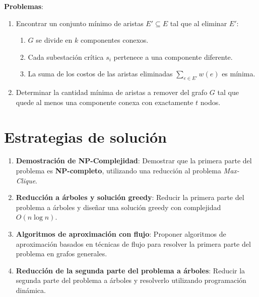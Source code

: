 \documentclass[a4paper, 12pt]{article}
\begin{document}
\noindent \textbf{Problemas}:
\begin{enumerate}
    \item Encontrar un conjunto mínimo de aristas \( E' \subseteq E \) tal que al eliminar \( E' \):
    \begin{enumerate}
        \item \( G \) se divide en \( k \) componentes conexos.
        \item Cada subestación crítica \( s_i \) pertenece a una componente diferente.
        \item La suma de los costos de las aristas eliminadas \( \sum_{e \in E'} w(e) \) es mínima.
    \end{enumerate}
    \item Determinar la cantidad mínima de aristas a remover del grafo \( G \) tal que quede al menos una componente conexa con exactamente \( t \) nodos.
\end{enumerate}

\section*{Estrategias de solución}
\begin{enumerate}
    \item \textbf{Demostración de NP-Complejidad}: 
    Demostrar que la primera parte del problema es \textbf{NP-completo}, utilizando una reducción al problema \textit{Max-Clique}.
    \item \textbf{Reducción a árboles y solución greedy}: 
    Reducir la primera parte del problema a árboles y diseñar una solución greedy con complejidad \( O(n \log n) \).
    \item \textbf{Algoritmos de aproximación con flujo}: 
    Proponer algoritmos de aproximación basados en técnicas de flujo para resolver la primera parte del problema en grafos generales.
    \item \textbf{Reducción de la segunda parte del problema a árboles}: 
    Reducir la segunda parte del problema a árboles y resolverlo utilizando programación dinámica.
\end{enumerate}
\end{document}

